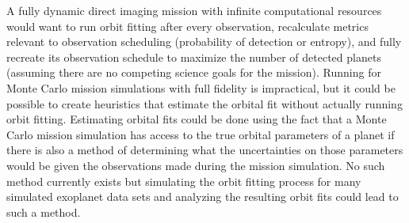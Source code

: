 A fully dynamic direct imaging mission with infinite computational resources
would want to run orbit fitting after every observation, recalculate metrics
relevant to observation scheduling (probability of detection or entropy), and
fully recreate its observation schedule to maximize the number of detected
planets (assuming there are no competing science goals for the mission).
Running for Monte Carlo mission simulations with full fidelity is impractical,
but it could be possible to create heuristics that estimate the orbital fit
without actually running orbit fitting. Estimating orbital fits could be done
using the fact that a Monte Carlo mission simulation has access to the true
orbital parameters of a planet if there is also a method of determining what
the uncertainties on those parameters would be given the observations made
during the mission simulation. No such method currently exists but simulating
the orbit fitting process for many simulated exoplanet data sets and analyzing
the resulting orbit fits could lead to such a method.
